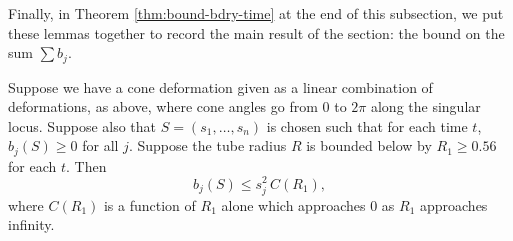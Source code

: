 Finally, in Theorem \ref{thm:bound-bdry-time} at the end of this
subsection, we put these lemmas together to record the main result of
the section: the bound on the sum $\sum b_j$.

\begin{lemma}
  Suppose we have a cone deformation given as a linear combination of
  deformations, as above, where cone angles go from $0$ to $2\pi$
  along the singular locus.  Suppose also that $S=(s_1, \dots, s_n)$
  is chosen such that for each time $t$, $b_j(S)\geq 0$ for all $j$.
  Suppose the tube radius $R$ is bounded below by $R_1 \geq 0.56$ for
  each $t$.  Then
  $$b_j(S) \leq s_j^2 \,C(R_1),$$
  where $C(R_1)$ is a function of $R_1$
  alone which approaches $0$ as $R_1$ approaches infinity.
\label{lemma:b_j-bound}
\end{lemma}

